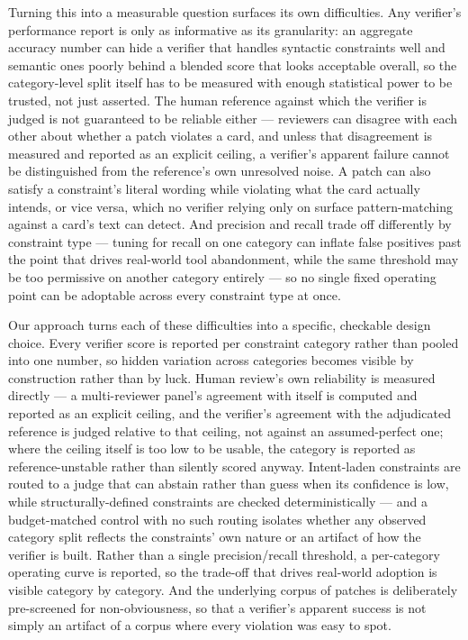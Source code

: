\documentclass[11pt]{article}
\begin{document}
Turning this into a measurable question surfaces its own difficulties. Any verifier's performance report is only as informative as its granularity: an aggregate accuracy number can hide a verifier that handles syntactic constraints well and semantic ones poorly behind a blended score that looks acceptable overall, so the category-level split itself has to be measured with enough statistical power to be trusted, not just asserted. The human reference against which the verifier is judged is not guaranteed to be reliable either --- reviewers can disagree with each other about whether a patch violates a card, and unless that disagreement is measured and reported as an explicit ceiling, a verifier's apparent failure cannot be distinguished from the reference's own unresolved noise. A patch can also satisfy a constraint's literal wording while violating what the card actually intends, or vice versa, which no verifier relying only on surface pattern-matching against a card's text can detect. And precision and recall trade off differently by constraint type --- tuning for recall on one category can inflate false positives past the point that drives real-world tool abandonment, while the same threshold may be too permissive on another category entirely --- so no single fixed operating point can be adoptable across every constraint type at once.

Our approach turns each of these difficulties into a specific, checkable design choice. Every verifier score is reported per constraint category rather than pooled into one number, so hidden variation across categories becomes visible by construction rather than by luck. Human review's own reliability is measured directly --- a multi-reviewer panel's agreement with itself is computed and reported as an explicit ceiling, and the verifier's agreement with the adjudicated reference is judged relative to that ceiling, not against an assumed-perfect one; where the ceiling itself is too low to be usable, the category is reported as reference-unstable rather than silently scored anyway. Intent-laden constraints are routed to a judge that can abstain rather than guess when its confidence is low, while structurally-defined constraints are checked deterministically --- and a budget-matched control with no such routing isolates whether any observed category split reflects the constraints' own nature or an artifact of how the verifier is built. Rather than a single precision/recall threshold, a per-category operating curve is reported, so the trade-off that drives real-world adoption is visible category by category. And the underlying corpus of patches is deliberately pre-screened for non-obviousness, so that a verifier's apparent success is not simply an artifact of a corpus where every violation was easy to spot.
\end{document}
